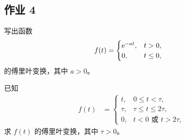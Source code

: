 \subsection{作业 4}

\begin{homework}
    写出函数
    \begin{align*}
        f(t) &= \begin{cases}
            \mathrm{e}^{-at}, & t > 0, \\
            0, & t \leq 0,
        \end{cases}
    \end{align*}
    的傅里叶变换，其中 $a > 0$。
\end{homework}

\begin{homework}
    已知
    \begin{align*}
        f(t) &= \begin{cases}
            t, & 0 \le t < \tau, \\
            \tau, & \tau \le t \le 2\tau, \\
            0, & t < 0 \text{ 或 } t > 2\tau,
        \end{cases}
    \end{align*}
    求 $f(t)$ 的傅里叶变换，其中 $\tau > 0$。
\end{homework}
